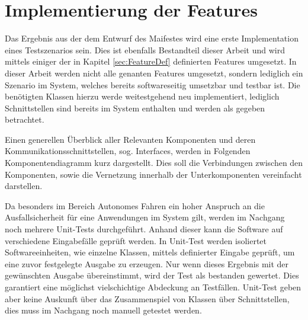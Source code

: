 \chapter{Implementierung der Features}\label{sec:Impl}
Das Ergebnis aus der dem Entwurf des Maifestes wird eine erste Implementation eines Testszenarios sein. Dies ist ebenfalls Bestandteil dieser Arbeit und wird mittels einiger der in Kapitel \ref{sec:FeatureDef} definierten Features umgesetzt. In dieser Arbeit werden nicht alle genanten Features umgesetzt, sondern lediglich ein Szenario im System, welches bereits softwareseitig umsetzbar und testbar ist. Die benötigten Klassen hierzu werde weitestgehend neu implementiert, lediglich Schnittstellen sind bereits im System enthalten und werden als gegeben betrachtet. 

Einen generellen Überblick aller Relevanten Komponenten und deren Kommunikationsschnittstellen, sog. Interfaces, werden in Folgenden Komponentendiagramm kurz dargestellt. Dies soll die Verbindungen zwischen den Komponenten, sowie die Vernetzung innerhalb der Unterkomponenten vereinfacht darstellen.

\newpage

Da besonders im Bereich Autonomes Fahren ein hoher Anspruch an die Ausfallsicherheit für eine Anwendungen im System gilt, werden im Nachgang noch mehrere Unit-Tests durchgeführt. Anhand dieser kann die Software auf verschiedene Eingabefälle geprüft werden. In Unit-Test werden isoliertet Softwareeinheiten, wie einzelne Klassen, mittels definierter Eingabe geprüft, um eine zuvor festgelegte Ausgabe zu erzeugen. Nur wenn dieses Ergebnis mit der gewünschten Ausgabe übereinstimmt, wird der Test als bestanden gewertet. Dies garantiert eine möglichst vielschichtige Abdeckung an Testfällen. Unit-Test geben aber keine Auskunft über das Zusammenspiel von Klassen über Schnittstellen, dies muss im Nachgang noch manuell getestet werden.


